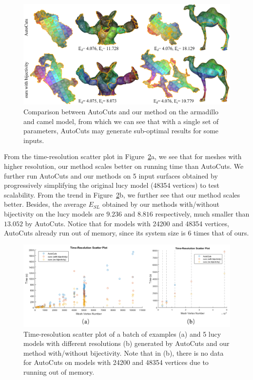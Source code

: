 \begin{figure}[!h]
\centering
\includegraphics[width=\linewidth]{fig/comp_AutoCuts.png}
\caption{Comparison between AutoCuts and our method on the armadillo and camel model, from which we can see that with a single set of parameters, AutoCuts may generate sub-optimal results for some inputs.}
\label{fig:comp_AutoCuts}
\end{figure}

From the time-resolution scatter plot in Figure~\ref{fig:time_res_compAutoCuts}a, we see that for meshes with higher resolution, our method scales better on running time than AutoCuts.
We further run AutoCuts and our methods on 5 input surfaces obtained by progressively simplifying the original lucy model (48354 vertices) to test scalability. From the trend in Figure~\ref{fig:time_res_compAutoCuts}b, we further see that our method scales better. Besides, the average $E_{SL}$ obtained by our methods with/without bijectivity on the lucy models are $9.236$ and $8.816$ respectively, much smaller than $13.052$ by AutoCuts. Notice that for models with 24200 and 48354 vertices, AutoCuts already run out of memory, since its system size is $6$ times that of ours.

\begin{figure}[!h]
\centering
\includegraphics[width=\linewidth]{fig/time_res_compAutoCuts.png}
\caption{Time-resolution scatter plot of a batch of examples (a) and 5 lucy models with different resolutions (b) generated by AutoCuts and our method with/without bijectivity. Note that in (b), there is no data for AutoCuts on models with 24200 and 48354 vertices due to running out of memory.}
\label{fig:time_res_compAutoCuts}
\end{figure}


